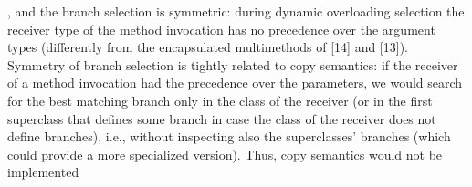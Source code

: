 \documentclass{article}
\begin{document}
, and the branch selection is symmetric: during dynamic overloading selection the receiver type of the method invocation has no precedence over the argument types (differently from the encapsulated multimethods of [14] and [13]).
Symmetry of branch selection is tightly related to copy semantics: if the receiver of a method invocation had the precedence over the parameters, we would search for the best matching branch only in the class of the receiver (or in the first superclass that defines some branch in case the class of the receiver does not define branches), i.e., without inspecting also the superclasses’ branches (which could provide a more specialized version). Thus, copy semantics would not be implemented

\medskip 


\end{document}
